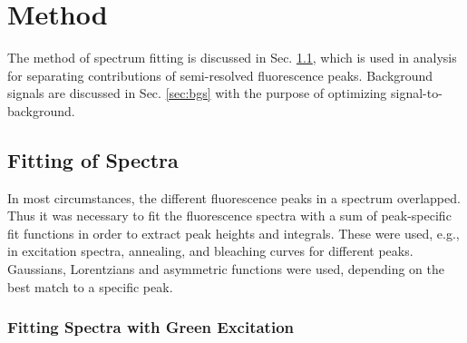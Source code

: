 \chapter{Method}

The method of spectrum fitting is discussed in Sec. \ref{sec:fitting}, which is used in analysis for separating contributions of semi-resolved fluorescence peaks.  Background signals are discussed in Sec. \ref{sec:bgs} with the purpose of optimizing signal-to-background.

\section{Fitting of Spectra}
\label{sec:fitting}

In most circumstances, the different fluorescence peaks in a spectrum overlapped.  Thus it was necessary to fit the fluorescence spectra with a sum of peak-specific fit functions in order to extract peak heights and integrals.  These were used, e.g., in excitation spectra, annealing, and bleaching curves for different peaks.  Gaussians, Lorentzians and asymmetric functions were used, depending on the best match to a specific peak.


\subsection{Fitting Spectra with Green Excitation}
\label{subsec:fitgrn}

